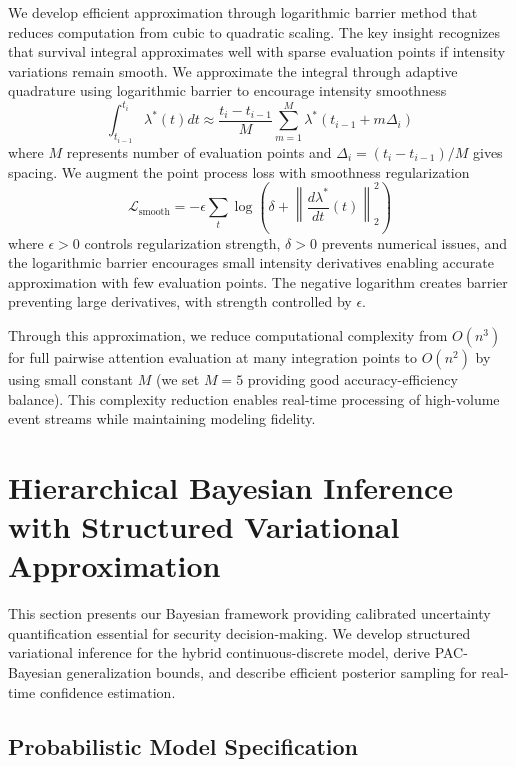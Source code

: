 \documentclass[10pt,journal,compsoc]{IEEEtran}
\begin{document}
We develop efficient approximation through logarithmic barrier method that reduces computation from cubic to quadratic scaling. The key insight recognizes that survival integral approximates well with sparse evaluation points if intensity variations remain smooth. We approximate the integral through adaptive quadrature using logarithmic barrier to encourage intensity smoothness
\begin{equation}
\int_{t_{i-1}}^{t_i} \lambda^*(t) dt \approx \frac{t_i - t_{i-1}}{M} \sum_{m=1}^M \lambda^*(t_{i-1} + m \Delta_i)
\end{equation}
where $M$ represents number of evaluation points and $\Delta_i = (t_i - t_{i-1})/M$ gives spacing. We augment the point process loss with smoothness regularization
\begin{equation}
\mathcal{L}_{\text{smooth}} = -\epsilon \sum_{t} \log\left(\delta + \left\|\frac{d\lambda^*}{dt}(t)\right\|_2^2\right)
\end{equation}
where $\epsilon > 0$ controls regularization strength, $\delta > 0$ prevents numerical issues, and the logarithmic barrier encourages small intensity derivatives enabling accurate approximation with few evaluation points. The negative logarithm creates barrier preventing large derivatives, with strength controlled by $\epsilon$.

Through this approximation, we reduce computational complexity from $O(n^3)$ for full pairwise attention evaluation at many integration points to $O(n^2)$ by using small constant $M$ (we set $M=5$ providing good accuracy-efficiency balance). This complexity reduction enables real-time processing of high-volume event streams while maintaining modeling fidelity.



\section{Hierarchical Bayesian Inference with Structured Variational Approximation}
\label{sec:bayesian}

This section presents our Bayesian framework providing calibrated uncertainty quantification essential for security decision-making. We develop structured variational inference for the hybrid continuous-discrete model, derive PAC-Bayesian generalization bounds, and describe efficient posterior sampling for real-time confidence estimation.

\subsection{Probabilistic Model Specification}
\end{document}
